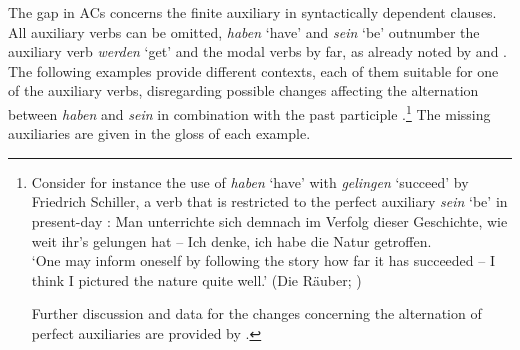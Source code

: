 \documentclass[output=paper,colorlinks,citecolor=brown]{langscibook}
\begin{document}
\largerpage
The gap in ACs concerns the finite auxiliary in syntactically dependent clauses. All auxiliary verbs can be omitted, \textit{haben} `have' and \textit{sein} `be' outnumber the auxiliary verb \textit{werden} `get' and the modal verbs by far, as already noted by \textcite{breitbarth2005} and \textcite{blum2018}. The following examples provide different contexts, each of them suitable for one of the auxiliary verbs, disregarding possible changes affecting the alternation between \textit{haben} and \textit{sein} in combination with the past participle \citep[387]{ERSW93,sapp2011a}.\footnote{Consider for instance the use of \textit{haben} `have' with \textit{gelingen} `succeed' by Friedrich Schiller, a verb that is restricted to the perfect auxiliary \textit{sein} `be' in present-day : 
\ea
Man unterrichte sich demnach im Verfolg dieser Geschichte, wie weit ihr's gelungen hat -- Ich denke, ich habe die Natur getroffen.  \\ `One may inform oneself by following the story how far it has succeeded -- I think I pictured the nature quite well.' \hfill (Die Räuber; \citet[275]{behaghel23})
\z

\noindent
Further discussion and data for the changes concerning the alternation of perfect auxiliaries are provided by \citet[273--282]{behaghel23}.
} The missing auxiliaries are given in the gloss of each example.  
\end{document}
